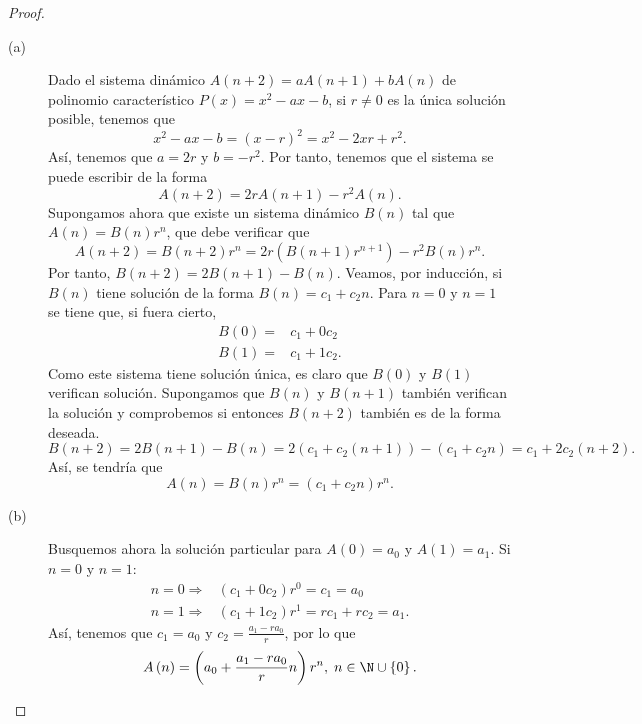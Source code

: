 \begin{proof}
\begin{description}
\item[(a)] Dado el sistema dinámico $\displaystyle A\left(n+2\right) = aA\left(n+1\right) + bA\left(n\right) $ de polinomio característico $\displaystyle P\left(x\right) = x^{2}-ax-b $, si $\displaystyle r \neq 0 $ es la única solución posible, tenemos que
\[x^{2} - ax - b = \left(x-r\right)^{2} = x^{2}-2xr + r^{2} .\]
Así, tenemos que $\displaystyle a = 2r $ y $\displaystyle b = - r^{2} $. Por tanto, tenemos que el sistema se puede escribir de la forma
\[A\left(n+2\right) = 2rA\left(n+1\right)-r^{2}A\left(n\right) .\]
Supongamos ahora que existe un sistema dinámico $\displaystyle B\left(n\right) $ tal que $\displaystyle A\left(n\right) = B\left(n\right)r^{n} $, que debe verificar que 
\[A\left(n+2\right) = B\left(n+2\right)r^{n} = 2r\left(B\left(n+1\right)r^{n+1}\right)-r^{2}B\left(n\right)r^{n} .\]
Por tanto, $\displaystyle B\left(n+2\right) = 2B\left(n+1\right)-B\left(n\right) $. Veamos, por inducción, si $\displaystyle B\left(n\right) $ tiene solución de la forma $\displaystyle B\left(n\right) = c_{1} + c_{2}n $. Para $\displaystyle n = 0 $ y $\displaystyle n = 1 $ se tiene que, si fuera cierto,
\[
\begin{split}
	B\left(0\right) = & c_{1} + 0c_{2} \\
	B\left(1\right) = & c_{1} + 1c_{2}.
\end{split}
\]
Como este sistema tiene solución única, es claro que $\displaystyle B\left(0\right) $ y $\displaystyle B\left(1\right) $ verifican solución. Supongamos que $\displaystyle B\left(n\right)  $ y $\displaystyle B\left(n+1\right) $ también verifican la solución y comprobemos si entonces $\displaystyle B\left(n+2\right) $ también es de la forma deseada.
\[B\left(n+2\right) = 2B\left(n+1\right) - B\left(n\right) = 2\left(c_{1} + c_{2}\left(n+1\right)\right)-\left(c_{1} + c_{2}n\right) = c_{1}+2c_{2}\left(n+2\right) .\]
Así, se tendría que 
\[A\left(n\right) = B\left(n\right) r^{n} = \left(c_{1} + c_{2}n\right)r^{n} .\]
\item[(b)] Busquemos ahora la solución particular para $\displaystyle A\left(0\right) = a_{0} $ y $\displaystyle A\left(1\right) = a_{1} $. Si $\displaystyle n = 0 $ y $\displaystyle n = 1 $:
	\[
	\begin{split}
		n = 0 \Rightarrow & \left(c_{1} + 0c_{2}\right)r^{0} = c_{1} = a_{0} \\
		n = 1 \Rightarrow & \left(c_{1} + 1c_{2}\right)r^{1} = rc_{1} + rc_{2} = a_{1}.
	\end{split}
	\]
Así, tenemos que $\displaystyle c_{1} = a_{0}$ y $\displaystyle c_{2} = \frac{a_{1}-ra_{0}}{r} $, por lo que
\[A\left(n\right) = \left(a_{0} + \frac{a_{1}-ra_{0}}{r}n\right)r^{n}, \; n \in \N \cup \left\{ 0\right\}  .\]
\end{description}
\end{proof}
